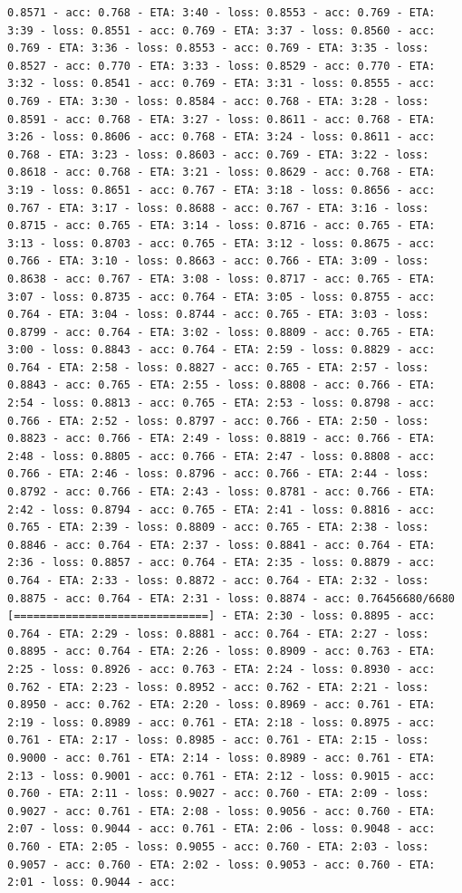 \documentclass[11pt]{article}
\begin{document}
\begin{Verbatim}[commandchars=\\\{\}]
0.8571 - acc: 0.768 - ETA: 3:40 - loss: 0.8553 - acc: 0.769 - ETA: 3:39 - loss: 0.8551 - acc: 0.769 - ETA: 3:37 - loss: 0.8560 - acc: 0.769 - ETA: 3:36 - loss: 0.8553 - acc: 0.769 - ETA: 3:35 - loss: 0.8527 - acc: 0.770 - ETA: 3:33 - loss: 0.8529 - acc: 0.770 - ETA: 3:32 - loss: 0.8541 - acc: 0.769 - ETA: 3:31 - loss: 0.8555 - acc: 0.769 - ETA: 3:30 - loss: 0.8584 - acc: 0.768 - ETA: 3:28 - loss: 0.8591 - acc: 0.768 - ETA: 3:27 - loss: 0.8611 - acc: 0.768 - ETA: 3:26 - loss: 0.8606 - acc: 0.768 - ETA: 3:24 - loss: 0.8611 - acc: 0.768 - ETA: 3:23 - loss: 0.8603 - acc: 0.769 - ETA: 3:22 - loss: 0.8618 - acc: 0.768 - ETA: 3:21 - loss: 0.8629 - acc: 0.768 - ETA: 3:19 - loss: 0.8651 - acc: 0.767 - ETA: 3:18 - loss: 0.8656 - acc: 0.767 - ETA: 3:17 - loss: 0.8688 - acc: 0.767 - ETA: 3:16 - loss: 0.8715 - acc: 0.765 - ETA: 3:14 - loss: 0.8716 - acc: 0.765 - ETA: 3:13 - loss: 0.8703 - acc: 0.765 - ETA: 3:12 - loss: 0.8675 - acc: 0.766 - ETA: 3:10 - loss: 0.8663 - acc: 0.766 - ETA: 3:09 - loss: 0.8638 - acc: 0.767 - ETA: 3:08 - loss: 0.8717 - acc: 0.765 - ETA: 3:07 - loss: 0.8735 - acc: 0.764 - ETA: 3:05 - loss: 0.8755 - acc: 0.764 - ETA: 3:04 - loss: 0.8744 - acc: 0.765 - ETA: 3:03 - loss: 0.8799 - acc: 0.764 - ETA: 3:02 - loss: 0.8809 - acc: 0.765 - ETA: 3:00 - loss: 0.8843 - acc: 0.764 - ETA: 2:59 - loss: 0.8829 - acc: 0.764 - ETA: 2:58 - loss: 0.8827 - acc: 0.765 - ETA: 2:57 - loss: 0.8843 - acc: 0.765 - ETA: 2:55 - loss: 0.8808 - acc: 0.766 - ETA: 2:54 - loss: 0.8813 - acc: 0.765 - ETA: 2:53 - loss: 0.8798 - acc: 0.766 - ETA: 2:52 - loss: 0.8797 - acc: 0.766 - ETA: 2:50 - loss: 0.8823 - acc: 0.766 - ETA: 2:49 - loss: 0.8819 - acc: 0.766 - ETA: 2:48 - loss: 0.8805 - acc: 0.766 - ETA: 2:47 - loss: 0.8808 - acc: 0.766 - ETA: 2:46 - loss: 0.8796 - acc: 0.766 - ETA: 2:44 - loss: 0.8792 - acc: 0.766 - ETA: 2:43 - loss: 0.8781 - acc: 0.766 - ETA: 2:42 - loss: 0.8794 - acc: 0.765 - ETA: 2:41 - loss: 0.8816 - acc: 0.765 - ETA: 2:39 - loss: 0.8809 - acc: 0.765 - ETA: 2:38 - loss: 0.8846 - acc: 0.764 - ETA: 2:37 - loss: 0.8841 - acc: 0.764 - ETA: 2:36 - loss: 0.8857 - acc: 0.764 - ETA: 2:35 - loss: 0.8879 - acc: 0.764 - ETA: 2:33 - loss: 0.8872 - acc: 0.764 - ETA: 2:32 - loss: 0.8875 - acc: 0.764 - ETA: 2:31 - loss: 0.8874 - acc: 0.76456680/6680 [==============================] - ETA: 2:30 - loss: 0.8895 - acc: 0.764 - ETA: 2:29 - loss: 0.8881 - acc: 0.764 - ETA: 2:27 - loss: 0.8895 - acc: 0.764 - ETA: 2:26 - loss: 0.8909 - acc: 0.763 - ETA: 2:25 - loss: 0.8926 - acc: 0.763 - ETA: 2:24 - loss: 0.8930 - acc: 0.762 - ETA: 2:23 - loss: 0.8952 - acc: 0.762 - ETA: 2:21 - loss: 0.8950 - acc: 0.762 - ETA: 2:20 - loss: 0.8969 - acc: 0.761 - ETA: 2:19 - loss: 0.8989 - acc: 0.761 - ETA: 2:18 - loss: 0.8975 - acc: 0.761 - ETA: 2:17 - loss: 0.8985 - acc: 0.761 - ETA: 2:15 - loss: 0.9000 - acc: 0.761 - ETA: 2:14 - loss: 0.8989 - acc: 0.761 - ETA: 2:13 - loss: 0.9001 - acc: 0.761 - ETA: 2:12 - loss: 0.9015 - acc: 0.760 - ETA: 2:11 - loss: 0.9027 - acc: 0.760 - ETA: 2:09 - loss: 0.9027 - acc: 0.761 - ETA: 2:08 - loss: 0.9056 - acc: 0.760 - ETA: 2:07 - loss: 0.9044 - acc: 0.761 - ETA: 2:06 - loss: 0.9048 - acc: 0.760 - ETA: 2:05 - loss: 0.9055 - acc: 0.760 - ETA: 2:03 - loss: 0.9057 - acc: 0.760 - ETA: 2:02 - loss: 0.9053 - acc: 0.760 - ETA: 2:01 - loss: 0.9044 - acc: 
\end{Verbatim}
\end{document}
